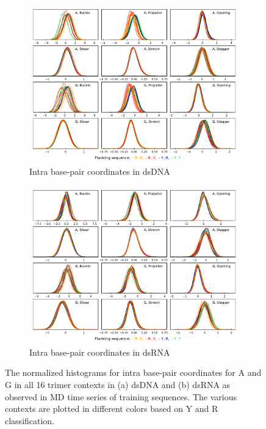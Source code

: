  \begin{figure}[H]
  \begin{subfigure}{15cm}
    \centering\includegraphics[width=15cm,trim=0cm 0cm 0cm 0.6cm]{images/DNA_intra_A_G.pdf}
    \caption{Intra base-pair coordinates in dsDNA}
  \end{subfigure}
  \begin{subfigure}{15cm}
    \centering\includegraphics[width=15cm]{images/RNA_intra_A_G.pdf}
    \caption{Intra base-pair coordinates in dsRNA}
  \end{subfigure}
\caption{The normalized histograms for intra base-pair coordinates for A and G in all 16 trimer contexts in (a) dsDNA and (b) dsRNA as observed in MD time series of training sequences. The various contexts are plotted in different colors based on Y and R classification.  
}
\label{c3:fig_distr_1}
\end{figure} 

